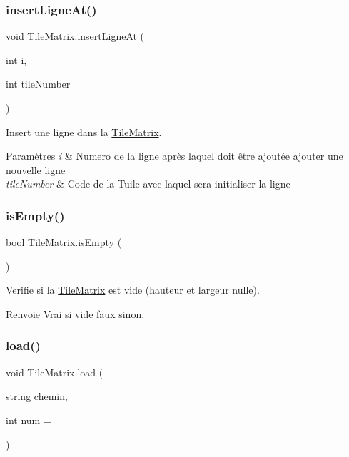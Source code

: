 \subsubsection{\texorpdfstring{insert\+Ligne\+At()}{insertLigneAt()}}
{\footnotesize\ttfamily void Tile\+Matrix.\+insert\+Ligne\+At (\begin{DoxyParamCaption}\item[{int}]{i,  }\item[{int}]{tile\+Number }\end{DoxyParamCaption})}



Insert une ligne dans la \hyperlink{class_tile_matrix}{Tile\+Matrix}. 


\begin{DoxyParams}{Paramètres}
{\em i} & Numero de la ligne après laquel doit être ajoutée ajouter une nouvelle ligne \\
\hline
{\em tile\+Number} & Code de la Tuile avec laquel sera initialiser la ligne \\
\hline
\end{DoxyParams}
\mbox{\label{class_tile_matrix_a0cdc3972eeb32776a7e1e28dc14cb0de}} 
\subsubsection{\texorpdfstring{is\+Empty()}{isEmpty()}}
{\footnotesize\ttfamily bool Tile\+Matrix.\+is\+Empty (\begin{DoxyParamCaption}{ }\end{DoxyParamCaption})}



Verifie si la \hyperlink{class_tile_matrix}{Tile\+Matrix} est vide (hauteur et largeur nulle). 

\begin{DoxyReturn}{Renvoie}
Vrai si vide faux sinon. 
\end{DoxyReturn}
\mbox{\label{class_tile_matrix_ad67296e27a165e8a0e1a2649c890664b}} 
\subsubsection{\texorpdfstring{load()}{load()}}
{\footnotesize\ttfamily void Tile\+Matrix.\+load (\begin{DoxyParamCaption}\item[{string}]{chemin,  }\item[{int}]{num = {} }\end{DoxyParamCaption})}



